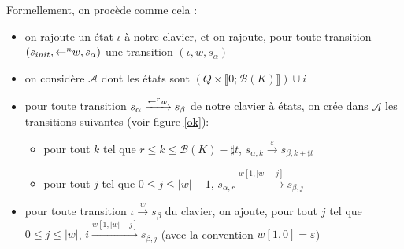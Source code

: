 \documentclass[12pt, a4paper]{article}
\newcommand{\A}{\mathcal{A}}
\begin{document}
    Formellement, on procède comme cela : 
    \begin{itemize}
        \item on rajoute un état $\iota$ à notre clavier, et on rajoute, pour toute transition $(s_{init},\mathord{\leftarrow}^n w,s_{\alpha})$ une transition $(\iota,w,s_{\alpha})$
        \item on considère $\A$ dont les états sont  $( Q \times \llbracket 0 ; \mathcal{B}(K) \rrbracket ) \cup i$
        \item pour toute transition $s_{\alpha} \xrightarrow{\mathord{\leftarrow}^r w} s_{\beta}$ de notre clavier à états, on crée dans $\A$ les transitions suivantes (voir figure \ref{ok}):
            \begin{itemize}
                \item pour tout $k$ tel que $r \leqslant k \leqslant \mathcal{B}(K) - \sharp t$, $s_{\alpha, k} \xrightarrow{\varepsilon} s_{\beta, k + \sharp t}$
                \item pour tout $j$ tel que $0 \leqslant j \leqslant |w| - 1$, $s_{\alpha, r} \xrightarrow{w[1,|w|-j]} s_{\beta, j}$
            \end{itemize} 
        \item pour toute transition $\iota \xrightarrow{w} s_{\beta}$ du clavier, on ajoute, pour tout $j$ tel que $0 \leqslant j \leqslant |w|$, $i \xrightarrow{w[1,|w|-j]} s_{\beta, j}$ (avec la convention $w[1,0] = \varepsilon$)   
    \end{itemize}
\end{document}
